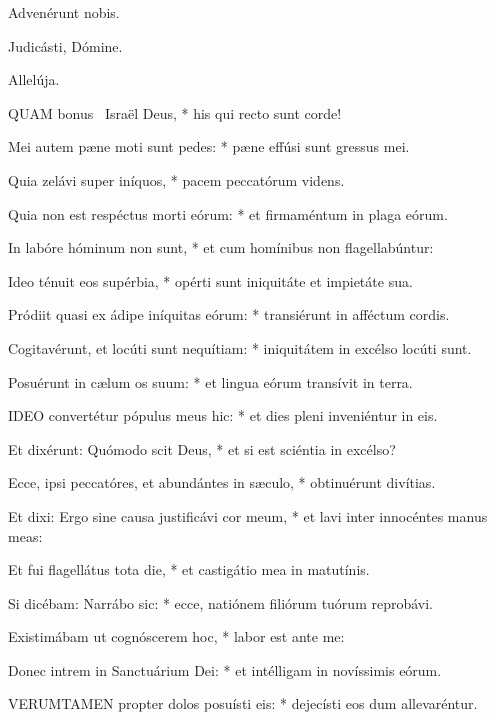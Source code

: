 

 Advenérunt nobis.


 Judicásti, Dómine.

  Allelúja.


\lettrine[lines=2]{Q}{UAM} bonus \textdagger\ Israël Deus, * his qui recto sunt corde!

Mei autem pæne moti sunt pedes: * pæne effúsi sunt gressus mei.

Quia zelávi super iníquos, * pacem peccatórum videns.

Quia non est respéctus morti eórum: * et firmaméntum in plaga eórum.

In labóre hóminum non sunt, * et cum homínibus non flagellabúntur:

Ideo ténuit eos supérbia, * opérti sunt iniquitáte et impietáte sua.

Pródiit quasi ex ádipe iníquitas eórum: * transiérunt in afféctum cordis.

Cogitavérunt, et locúti sunt nequítiam: * iniquitátem in excélso locúti sunt.

Posuérunt in cælum os suum: * et lingua eórum transívit in terra.


\lettrine[lines=2]{I}{DEO} convertétur pópulus meus hic: * et dies pleni inveniéntur in eis.

Et dixérunt: Quómodo scit Deus, * et si est sciéntia in excélso?

Ecce, ipsi peccatóres, et abundántes in sæculo, * obtinuérunt divítias.

Et dixi: Ergo sine causa justificávi cor meum, * et lavi inter innocéntes manus meas:

Et fui flagellátus tota die, * et castigátio mea in matutínis.

Si dicébam: Narrábo sic: * ecce, natiónem filiórum tuórum reprobávi.

Existimábam ut cognóscerem hoc, * labor est ante me:

Donec intrem in Sanctuárium Dei: * et intélligam in novíssimis eórum.


\lettrine[lines=2]{V}{ERUMTAMEN} propter dolos posuísti eis: * dejecísti eos dum allevaréntur.

